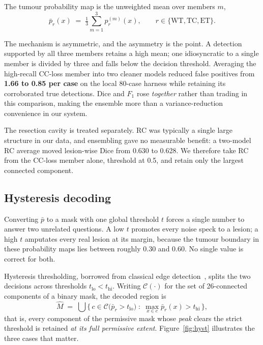 \documentclass[runningheads]{llncs}
\begin{document}
The tumour probability map is the unweighted mean over members $m$,
\[
\bar{p}_r(x) \;=\; \tfrac{1}{3}\sum_{m=1}^{3} p_r^{(m)}(x), \qquad
r \in \{\mathrm{WT},\mathrm{TC},\mathrm{ET}\}.
\]

The mechanism is asymmetric, and the asymmetry is the point. A detection supported by all three
members retains a high mean; one idiosyncratic to a single member is divided by three and falls
below the decision threshold. Averaging the high-recall CC-loss member into two cleaner models
reduced false positives from \textbf{1.66 to 0.85 per case} on the local 80-case harness while retaining its corroborated true
detections. Dice and $F_1$ rose \emph{together} rather than trading in this comparison, making the ensemble
more than a variance-reduction convenience in our system.

The resection cavity is treated separately. RC was typically a single large structure in our data, and ensembling gave no measurable benefit:
a two-model RC average moved lesion-wise Dice from 0.630 to 0.628.
We therefore take RC from the CC-loss member alone, threshold at 0.5, and retain only the largest
connected component.

\subsection{Hysteresis decoding}
\label{sec:hysteresis}

Converting $\bar{p}$ to a mask with one global threshold $t$ forces a single number to answer two
unrelated questions. A low $t$ promotes every noise speck to a lesion; a high $t$ amputates every
real lesion at its margin, because the tumour boundary in these probability maps lies between
roughly 0.30 and 0.60. No single value is correct for both.

Hysteresis thresholding, borrowed from classical edge detection~\cite{canny1986}, splits the two
decisions across thresholds $t_{\mathrm{lo}} < t_{\mathrm{hi}}$. Writing $\mathcal{C}(\cdot)$ for the set of 26-connected
components of a binary mask, the decoded region is
\[
\hat{M} \;=\; \bigcup \Big\{\, c \in \mathcal{C}\big(\bar{p}_r > t_{\mathrm{lo}}\big) \;:\;
\max_{x \in c} \bar{p}_r(x) > t_{\mathrm{hi}} \,\Big\},
\]
that is, every component of the permissive mask whose \emph{peak} clears the strict threshold is
retained \emph{at its full permissive extent}. Figure~\ref{fig:hyst} illustrates the three cases
that matter.
\end{document}
